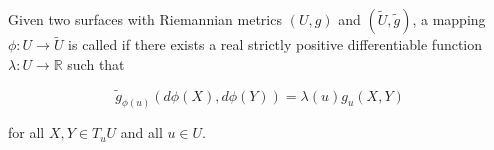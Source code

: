 Given two surfaces with Riemannian metrics $(U, g)$ and $(\tilde{U}, \tilde{g})$, a mapping $\phi: U \rightarrow \tilde{U}$ is called  if there exists a real strictly positive differentiable function $\lambda: U \rightarrow \mathbb{R}$ such that

$$\tilde{g}_{\phi(u)}(d\phi(X), d\phi(Y)) = \lambda(u) g_u(X, Y)$$

for all $X, Y \in T_u U$ and all $u \in U$.